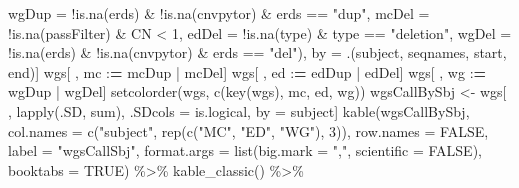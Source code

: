 \documentclass[11pt,letterpaper,oneside]{book}
\newenvironment{Shaded}{\begin{snugshade}}{\end{snugshade}}
\newcommand{\AttributeTok}[1]{\textcolor[rgb]{0.77,0.63,0.00}{#1}}
\newcommand{\ConstantTok}[1]{\textcolor[rgb]{0.00,0.00,0.00}{#1}}
\newcommand{\DecValTok}[1]{\textcolor[rgb]{0.00,0.00,0.81}{#1}}
\newcommand{\ErrorTok}[1]{\textcolor[rgb]{0.64,0.00,0.00}{\textbf{#1}}}
\newcommand{\FunctionTok}[1]{\textcolor[rgb]{0.00,0.00,0.00}{#1}}
\newcommand{\NormalTok}[1]{#1}
\newcommand{\OtherTok}[1]{\textcolor[rgb]{0.56,0.35,0.01}{#1}}
\newcommand{\SpecialCharTok}[1]{\textcolor[rgb]{0.00,0.00,0.00}{#1}}
\newcommand{\StringTok}[1]{\textcolor[rgb]{0.31,0.60,0.02}{#1}}
\begin{document}
\begin{Shaded}
\begin{Highlighting}[]
             \AttributeTok{wgDup =} \SpecialCharTok{!}\FunctionTok{is.na}\NormalTok{(erds) }\SpecialCharTok{\&} \SpecialCharTok{!}\FunctionTok{is.na}\NormalTok{(cnvpytor) }\SpecialCharTok{\&}\NormalTok{ erds }\SpecialCharTok{==} \StringTok{"dup"}\NormalTok{,}
             \AttributeTok{mcDel =} \SpecialCharTok{!}\FunctionTok{is.na}\NormalTok{(passFilter) }\SpecialCharTok{\&}\NormalTok{ CN }\SpecialCharTok{\textless{}} \DecValTok{1}\NormalTok{,}
             \AttributeTok{edDel =} \SpecialCharTok{!}\FunctionTok{is.na}\NormalTok{(type) }\SpecialCharTok{\&}\NormalTok{ type }\SpecialCharTok{==} \StringTok{"deletion"}\NormalTok{,}
             \AttributeTok{wgDel =} \SpecialCharTok{!}\FunctionTok{is.na}\NormalTok{(erds) }\SpecialCharTok{\&} \SpecialCharTok{!}\FunctionTok{is.na}\NormalTok{(cnvpytor) }\SpecialCharTok{\&}\NormalTok{ erds }\SpecialCharTok{==} \StringTok{"del"}\NormalTok{),}
\NormalTok{           by }\OtherTok{=}\NormalTok{ .(subject, seqnames, start, end)]}
\NormalTok{wgs[ , mc }\SpecialCharTok{:}\ErrorTok{=}\NormalTok{ mcDup }\SpecialCharTok{|}\NormalTok{ mcDel]}
\NormalTok{wgs[ , ed }\SpecialCharTok{:}\ErrorTok{=}\NormalTok{ edDup }\SpecialCharTok{|}\NormalTok{ edDel]}
\NormalTok{wgs[ , wg }\SpecialCharTok{:}\ErrorTok{=}\NormalTok{ wgDup }\SpecialCharTok{|}\NormalTok{ wgDel]}
\FunctionTok{setcolorder}\NormalTok{(wgs, }\FunctionTok{c}\NormalTok{(}\FunctionTok{key}\NormalTok{(wgs), }\StringTok{\textquotesingle{}mc\textquotesingle{}}\NormalTok{, }\StringTok{\textquotesingle{}ed\textquotesingle{}}\NormalTok{, }\StringTok{\textquotesingle{}wg\textquotesingle{}}\NormalTok{))}
\NormalTok{wgsCallBySbj }\OtherTok{\textless{}{-}}\NormalTok{ wgs[ , }\FunctionTok{lapply}\NormalTok{(.SD, sum), .SDcols }\OtherTok{=}\NormalTok{ is.logical, by }\OtherTok{=}\NormalTok{ subject]}
\FunctionTok{kable}\NormalTok{(wgsCallBySbj,}
      \AttributeTok{col.names =} \FunctionTok{c}\NormalTok{(}\StringTok{"subject"}\NormalTok{, }\FunctionTok{rep}\NormalTok{(}\FunctionTok{c}\NormalTok{(}\StringTok{"MC"}\NormalTok{, }\StringTok{"ED"}\NormalTok{, }\StringTok{"WG"}\NormalTok{), }\DecValTok{3}\NormalTok{)),}
      \AttributeTok{row.names =} \ConstantTok{FALSE}\NormalTok{, }
      \AttributeTok{label =} \StringTok{"wgsCallSbj"}\NormalTok{,}
      \AttributeTok{format.args =} \FunctionTok{list}\NormalTok{(}\AttributeTok{big.mark =} \StringTok{","}\NormalTok{, }\AttributeTok{scientific =} \ConstantTok{FALSE}\NormalTok{),}
      \AttributeTok{booktabs =} \ConstantTok{TRUE}\NormalTok{) }\SpecialCharTok{\%\textgreater{}\%}
  \FunctionTok{kable\_classic}\NormalTok{() }\SpecialCharTok{\%\textgreater{}\%}

\end{Highlighting}
\end{Shaded}
\end{document}
